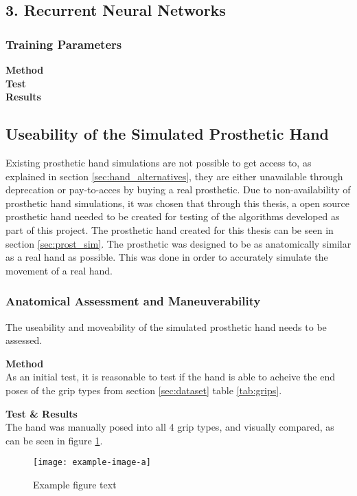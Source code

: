 \documentclass[../main.tex]{subfiles}
\begin{document}
\subsection{3. Recurrent Neural Networks}

\subsubsection{Training Parameters}
\textbf{Method}\\
\textbf{Test}\\
\textbf{Results}\\


\subsection{Useability of the Simulated Prosthetic Hand}

Existing prosthetic hand simulations are not possible to get access to, as explained in section \ref{sec:hand_alternatives}, they are either unavailable through deprecation or pay-to-acces by buying a real prosthetic.
Due to non-availability of prosthetic hand simulations, it was chosen that through this thesis, a open source prosthetic hand needed to be created for testing of the algorithms developed as part of this project.
The prosthetic hand created for this thesis can be seen in section \ref{sec:prost_sim}.
The prosthetic was designed to be as anatomically similar as a real hand as possible.
This was done in order to accurately simulate the movement of a real hand.

\subsubsection{Anatomical Assessment and Maneuverability}

The useability and moveability of the simulated prosthetic hand needs to be assessed.

\textbf{Method}\\
As an initial test, it is reasonable to test if the hand is able to acheive the end poses of the grip types from section \ref{sec:dataset} table \ref{tab:grips}. 

\textbf{Test \& Results}\\

The hand was manually posed into all 4 grip types, and visually compared, as can be seen in figure  \ref{fig:hand_pose_test}.

\begin{figure}[h]
\begin{center}
\texttt{[image: example-image-a]}
\caption{Example figure text}
\label{fig:hand_pose_test}
\end{center}
\end{figure}
\end{document}

